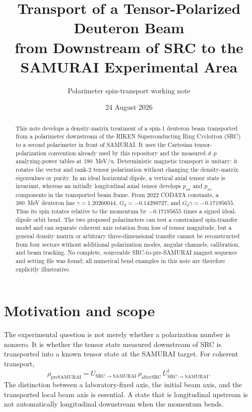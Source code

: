 \documentclass[11pt,a4paper]{article}
\title{Transport of a Tensor-Polarized Deuteron Beam\\from Downstream of SRC to the SAMURAI Experimental Area}
\author{Polarimeter spin-transport working note}
\date{24 August 2026}
\newcommand{\rhoA}{\rho_{\mathrm{afterSRC}}}
\newcommand{\rhoS}{\rho_{\mathrm{preSAMURAI}}}
\begin{document}
\maketitle

\begin{abstract}
This note develops a density-matrix treatment of a spin-1 deuteron beam transported from a polarimeter downstream of the RIKEN Superconducting Ring Cyclotron (SRC) to a second polarimeter in front of SAMURAI.  It uses the Cartesian tensor-polarization convention already used by this repository and the measured $d$--$p$ analyzing-power tables at \SI{190}{MeV/u}.  Deterministic magnetic transport is unitary: it rotates the vector and rank-2 tensor polarization without changing the density-matrix eigenvalues or purity.  In an ideal horizontal dipole, a vertical axial tensor state is invariant, whereas an initially longitudinal axial tensor develops $p_{xx}$ and $p_{xz}$ components in the transported beam frame.  From 2022 CODATA constants, a \SI{380}{MeV} deuteron has $\gamma=1.20260044$, $G_d=-0.14298727$, and $G_d\gamma=-0.17195655$.  Thus its spin rotates relative to the momentum by $-0.17195655$ times a signed ideal-dipole orbit bend.  The two proposed polarimeters can test a constrained spin-transfer model and can separate coherent axis rotation from loss of tensor magnitude, but a general density matrix or arbitrary three-dimensional transfer cannot be reconstructed from four sectors without additional polarization modes, angular channels, calibration, and beam tracking.  No complete, sourceable SRC-to-pre-SAMURAI magnet sequence and setting file was found; all numerical bend examples in this note are therefore explicitly illustrative.
\end{abstract}

\begin{center}
\end{center}

\tableofcontents
\clearpage

\section{Motivation and scope}

The experimental question is not merely whether a polarization number is nonzero.  It is whether the tensor state measured downstream of SRC is transported into a known tensor state at the SAMURAI target.  For coherent transport,
\begin{equation}
 \boxed{\rhoS=U_{\mathrm{SRC\to SAMURAI}}\,\rhoA\,
 U_{\mathrm{SRC\to SAMURAI}}^\dagger}. \label{eq:central}
\end{equation}
The distinction between a laboratory-fixed axis, the initial beam axis, and the transported local beam axis is essential.  A state that is longitudinal upstream is not automatically longitudinal downstream when the momentum bends.
\end{document}
